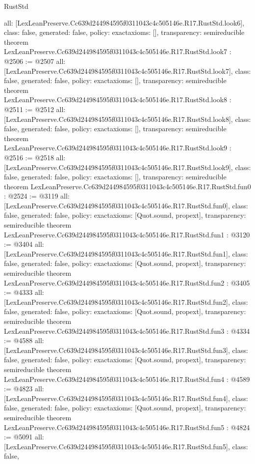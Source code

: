 \begin{lexlean}{RustStd}
\begin{coremodule}
{  all: [LexLeanPreserve.Cc639d244984595f0311043c4c505146e.R17.RustStd.look6],
  class: false,
  generated: false,
  policy: exact{axioms: []},
  transparency: semireducible
}
theorem LexLeanPreserve.Cc639d244984595f0311043c4c505146e.R17.RustStd.look7 : @2506 := @2507 {
  all: [LexLeanPreserve.Cc639d244984595f0311043c4c505146e.R17.RustStd.look7],
  class: false,
  generated: false,
  policy: exact{axioms: []},
  transparency: semireducible
}
theorem LexLeanPreserve.Cc639d244984595f0311043c4c505146e.R17.RustStd.look8 : @2511 := @2512 {
  all: [LexLeanPreserve.Cc639d244984595f0311043c4c505146e.R17.RustStd.look8],
  class: false,
  generated: false,
  policy: exact{axioms: []},
  transparency: semireducible
}
theorem LexLeanPreserve.Cc639d244984595f0311043c4c505146e.R17.RustStd.look9 : @2516 := @2518 {
  all: [LexLeanPreserve.Cc639d244984595f0311043c4c505146e.R17.RustStd.look9],
  class: false,
  generated: false,
  policy: exact{axioms: []},
  transparency: semireducible
}
theorem LexLeanPreserve.Cc639d244984595f0311043c4c505146e.R17.RustStd.fun0 : @2524 := @3119 {
  all: [LexLeanPreserve.Cc639d244984595f0311043c4c505146e.R17.RustStd.fun0],
  class: false,
  generated: false,
  policy: exact{axioms: [Quot.sound, propext]},
  transparency: semireducible
}
theorem LexLeanPreserve.Cc639d244984595f0311043c4c505146e.R17.RustStd.fun1 : @3120 := @3404 {
  all: [LexLeanPreserve.Cc639d244984595f0311043c4c505146e.R17.RustStd.fun1],
  class: false,
  generated: false,
  policy: exact{axioms: [Quot.sound, propext]},
  transparency: semireducible
}
theorem LexLeanPreserve.Cc639d244984595f0311043c4c505146e.R17.RustStd.fun2 : @3405 := @4333 {
  all: [LexLeanPreserve.Cc639d244984595f0311043c4c505146e.R17.RustStd.fun2],
  class: false,
  generated: false,
  policy: exact{axioms: [Quot.sound, propext]},
  transparency: semireducible
}
theorem LexLeanPreserve.Cc639d244984595f0311043c4c505146e.R17.RustStd.fun3 : @4334 := @4588 {
  all: [LexLeanPreserve.Cc639d244984595f0311043c4c505146e.R17.RustStd.fun3],
  class: false,
  generated: false,
  policy: exact{axioms: [Quot.sound, propext]},
  transparency: semireducible
}
theorem LexLeanPreserve.Cc639d244984595f0311043c4c505146e.R17.RustStd.fun4 : @4589 := @4823 {
  all: [LexLeanPreserve.Cc639d244984595f0311043c4c505146e.R17.RustStd.fun4],
  class: false,
  generated: false,
  policy: exact{axioms: [Quot.sound, propext]},
  transparency: semireducible
}
theorem LexLeanPreserve.Cc639d244984595f0311043c4c505146e.R17.RustStd.fun5 : @4824 := @5091 {
  all: [LexLeanPreserve.Cc639d244984595f0311043c4c505146e.R17.RustStd.fun5],
  class: false,
}
\end{coremodule}
\end{lexlean}
